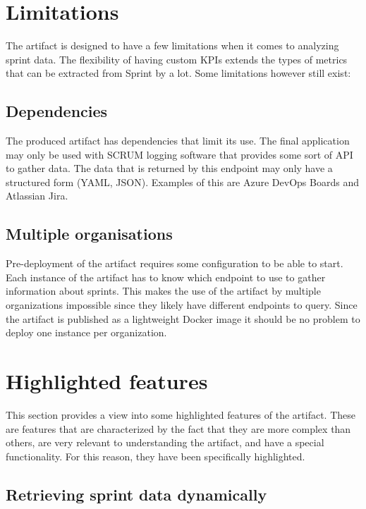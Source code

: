 \section{Limitations}

The artifact is designed to have a few limitations when it comes to analyzing sprint data. The flexibility of having custom KPIs extends the types of metrics that can be extracted from Sprint by a lot. Some limitations however still exist:

\subsection{Dependencies}

The produced artifact has dependencies that limit its use. The final application may only be used with SCRUM logging software that provides some sort of API to gather data. The data that is returned by this endpoint may only have a structured form (YAML, JSON). Examples of this are Azure DevOps Boards and Atlassian Jira.

\subsection{Multiple organisations}
Pre-deployment of the artifact requires some configuration to be able to start. Each instance of the artifact has to know which endpoint to use to gather information about sprints. This makes the use of the artifact by multiple organizations impossible since they likely have different endpoints to query. Since the artifact is published as a lightweight Docker image it should be no problem to deploy one instance per organization. 

\section{Highlighted features}

This section provides a view into some highlighted features of the artifact. These are features that are characterized by the fact that they are more complex than others, are very relevant to understanding the artifact, and have a special functionality. For this reason, they have been specifically highlighted.

\subsection{Retrieving sprint data dynamically}

